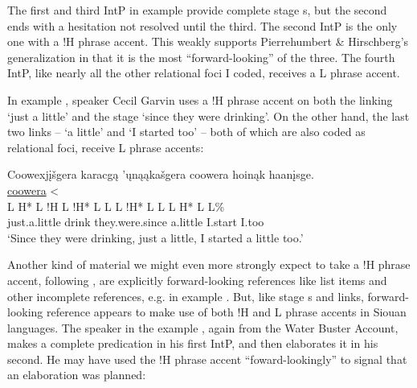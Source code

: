 \documentclass[output=paper]{LSP/langsci}
\begin{document}
The first and third IntP in example  provide complete stage s, but the second ends with a hesitation not resolved until the third. The second IntP is the only one with a !H phrase accent. This weakly supports Pierrehumbert \& Hirschberg’s generalization in that it is the most “forward-looking” of the three. The fourth IntP, like nearly all the other relational foci I coded, receives a L phrase accent.

In example ,  speaker Cecil Garvin uses a !H phrase accent on both the linking  `just a little' and the stage   `since they were drinking'. On the other hand, the last two links --  `a little' and  `I started too' -- both of which are also coded as relational foci, receive L phrase accents:

\ea\label{garvinphraseaccent}
 	Coowexjįšgera karacgą ’ųnąąkašgera coowera hoinąk haanįsge.\rmfnm\\
\glll	{}			{\uline{coowera} <}		\\
	{\ob L H* L !H\cb}				{\ob L !H* L}				{L\cb}	{\ob L !H* L L\cb}		{\ob L H* L}						{\hspaceThis{haanįs}\ob{}L\%}\\
	just.a.little					drink					they.were.since				a.little				I.start						I.too\\
\glt	`Since they were drinking, just a little, I started a little too.'
\z

Another kind of material we might even more strongly expect to take a !H phrase accent, following \citet{PierrehumbertHirschberg1990}, are explicitly for\-ward-looking references like list items and other incomplete references, e.g.  in example . But, like stage s and links, forward-looking reference appears to make use of both !H and L phrase accents in Siouan languages. The speaker in the  example , again from the Water Buster Account, makes a complete predication in his first IntP, and then elaborates it in his second. He may have used the !H phrase accent “foward-lookingly” to signal that an elaboration was planned:
\end{document}
